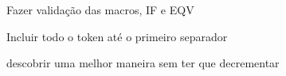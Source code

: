 
\begin{DoxyRefList}
\item[\label{todo__todo000004}%
\hypertarget{todo__todo000004}{}%
Membro \hyperlink{macroeval_8h_ab726e2a9f26698bddb5ddd13683e6630}{macroeval} (int argc, char $\ast$$\ast$argv)]Fazer validação das macros, I\-F e E\-Q\-V  
\item[\label{todo__todo000002}%
\hypertarget{todo__todo000002}{}%
Membro \hyperlink{lexer_8h_a63ef6d488951c4541159fe0961565c4d}{scanner} (std\-::string line, int $\ast$position)]Incluir todo o token até o primeiro separador 

descobrir uma melhor maneira sem ter que decrementar 
\end{DoxyRefList}